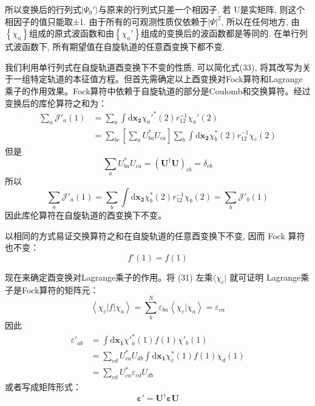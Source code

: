 \documentclass[]{article}
\begin{document}
所以变换后的行列式$|\Psi_0'\rangle$与原来的行列式只差一个相因子. 若 $\mathrm{U}$是实矩阵, 则这个相因子的值只能取±1. 由于所有的可观测性质仅依赖于$|\Psi|^2$, 所以在任何地方, 由$\left\lbrace \chi_a\right\rbrace $组成的原式波函数和由$\left\lbrace \chi_a'\right\rbrace $组成的变换后的波函数都是等同的. 在单行列式波函数下, 所有期望值在自旋轨道的任意酉变换下都不变.

我们利用单行列式在自旋轨道酉变换下不变的性质, 可以简化式(33), 将其改写为关于一组特定轨道的本征值方程。但首先需确定以上酉变换对Fock算符和Lagrange乘子的作用效果。Fock算符中依赖于自旋轨道的部分是Coulomb和交换算符。经过变换后的库伦算符之和为：
\begin{align}
	\sum\limits_a\mathscr{J}'_a(1)
	&=\sum\limits_a\int\mathrm{d}\mathbf{x_2}\chi_a'^*(2)r^{-1}_{12}\chi_a'(2)\nonumber\\
	&=\sum\limits_{bc}\left[ \sum\limits_aU^*_{ba}U_{ca}\right] \sum\limits_b\int\mathrm{d}\mathbf{x_2}\chi_b^*(2)r^{-1}_{12}\chi_c(2)
\end{align}
但是
\begin{equation}
	\sum\limits_aU^*_{ba}U_{ca}=(\mathbf{U^{\dagger}U})_{cb}=\delta_{cb}
\end{equation}
所以
\begin{equation}
	\sum\limits_a\mathscr{J}'_a(1)=\sum\limits_b\int\mathrm{d}\mathbf{x_2}\chi_b^*(2)r^{-1}_{12}\chi_b(2)=\sum\limits_b\mathscr{J}'_b(1)
\end{equation}
因此库伦算符在自旋轨道的酉变换下不变。

以相同的方式易证交换算符之和在自旋轨道的任意酉变换下不变, 因而 Fock 算符也不变：
\begin{equation}
	f'(1)=f(1)
\end{equation}

现在来确定酉变换对Lagrange乘子的作用。将 (31) 左乘$\langle\chi_c|$ 就可证明 Lagrange乘子是Fock算符的矩阵元：
\begin{equation}
	\left\langle \chi_c|f|\chi_a\right\rangle =\sum\limits^N_b\varepsilon_{ba}\left\langle \chi_c|\chi_a\right\rangle=\varepsilon_{ca}
\end{equation}
因此
\begin{align}
	\varepsilon'_{ab}
	&=\int\mathrm{d}\mathbf{x_1}\chi'^*_a(1)f(1)\chi'_b(1)\nonumber\\
	&=\sum\limits_{cd}U^*_{ca}U_{db}\int\mathrm{d}\mathbf{x_1}\chi_c^*(1)f(1)\chi_d(1)\nonumber\\
	&=\sum\limits_{cd}U^*_{ca}\varepsilon_{cd}U_{db}
\end{align}
或者写成矩阵形式：
\begin{equation}
	\mathbf{\varepsilon'}=\mathbf{U^\dagger\varepsilon U}
\end{equation}
\end{document}
